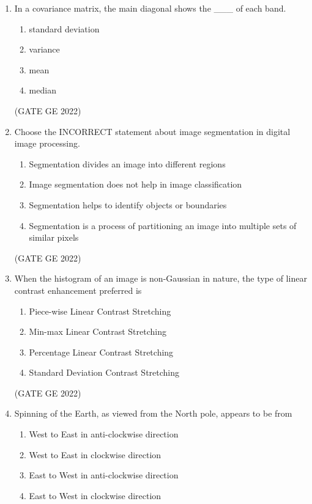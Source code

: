 \documentclass[journal,12pt,onecolumn]{IEEEtran}
\theoremstyle{remark}
\begin{document}
\begin{enumerate}
\item In a covariance matrix, the main diagonal shows the \_\_\_ of each band.
\begin{enumerate}
    \item standard deviation
    \item variance
    \item mean
    \item median
\end{enumerate}

\hfill (GATE GE 2022)

\item Choose the INCORRECT statement about image segmentation in digital image processing.
\begin{enumerate}
    \item Segmentation divides an image into different regions
    \item Image segmentation does not help in image classification
    \item Segmentation helps to identify objects or boundaries
    \item Segmentation is a process of partitioning an image into multiple sets of similar pixels
\end{enumerate}

\hfill (GATE GE 2022)

\item When the histogram of an image is non-Gaussian in nature, the type of linear contrast enhancement preferred is
\begin{enumerate}
    \item Piece-wise Linear Contrast Stretching
    \item Min-max Linear Contrast Stretching
    \item Percentage Linear Contrast Stretching
    \item Standard Deviation Contrast Stretching
\end{enumerate}

\hfill (GATE GE 2022)

\item Spinning of the Earth, as viewed from the North pole, appears to be from
\begin{enumerate}
    \item West to East in anti-clockwise direction
    \item West to East in clockwise direction
    \item East to West in anti-clockwise direction
    \item East to West in clockwise direction
\end{enumerate}


\end{enumerate}
\end{document}
